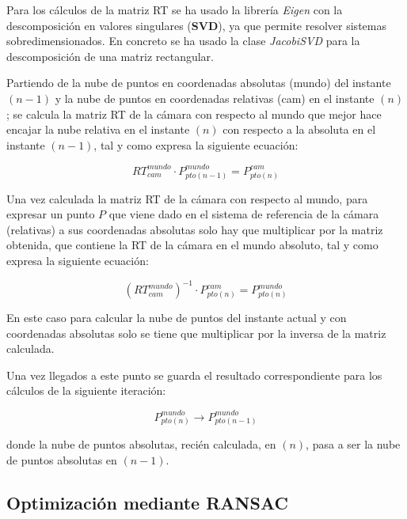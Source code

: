 Para los cálculos de la matriz RT se ha usado la librería \textit{Eigen} con la descomposición en valores singulares (\textbf{SVD}), ya que permite resolver sistemas sobredimensionados. En concreto se ha usado la clase \textit{JacobiSVD} para la descomposición de una matriz rectangular.

Partiendo de la nube de puntos en coordenadas absolutas (mundo) del instante $(n-1)$ y la nube de puntos en coordenadas relativas (cam) en el instante $(n)$; se calcula la matriz RT de la cámara con respecto al mundo que mejor hace encajar la nube relativa en el instante $(n)$ con respecto a la absoluta en el instante $(n-1)$, tal y como expresa la siguiente ecuación:


\begin{equation}
RT_{cam}^{mundo}\cdot P_{pto(n-1)}^{mundo}=P_{pto(n)}^{cam}
\end{equation}

Una vez calculada la matriz RT de la cámara con respecto al mundo, para expresar un punto $P$ que viene dado en el sistema de referencia de la cámara (relativas) a sus coordenadas absolutas solo hay que multiplicar por la matriz obtenida, que contiene la RT de la cámara en el mundo absoluto, tal y como expresa la siguiente ecuación:

\begin{equation}
\left(RT_{cam}^{mundo}\right)^{-1}\cdot P_{pto(n)}^{cam}=P_{pto(n)}^{mundo}
\end{equation}

En este caso para calcular la nube de puntos del instante actual y con coordenadas absolutas solo se tiene que multiplicar por la inversa de la matriz calculada.

Una vez llegados a este punto se guarda el resultado correspondiente para los cálculos de la siguiente iteración:

\begin{equation}
P_{pto(n)}^{mundo}\longrightarrow P_{pto(n-1)}^{mundo}
\end{equation}

donde la nube de puntos absolutas, recién calculada, en $(n)$, pasa a ser la nube de puntos absolutas en $(n-1)$.
\subsection{Optimización mediante RANSAC}


